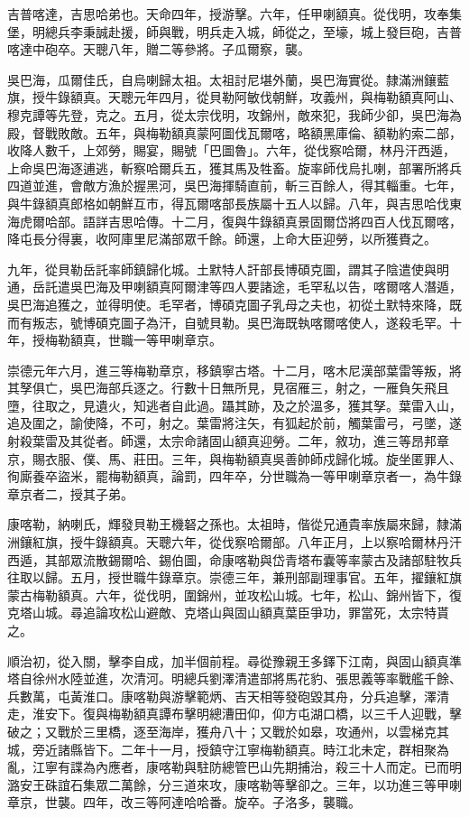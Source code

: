 \begin{pinyinscope}
吉普喀達，吉思哈弟也。天命四年，授游擊。六年，任甲喇額真。從伐明，攻奉集堡，明總兵李秉誠赴援，師與戰，明兵走入城，師從之，至壕，城上發巨砲，吉普喀達中砲卒。天聰八年，贈二等參將。子瓜爾察，襲。

吳巴海，瓜爾佳氏，自烏喇歸太祖。太祖討尼堪外蘭，吳巴海實從。隸滿洲鑲藍旗，授牛錄額真。天聰元年四月，從貝勒阿敏伐朝鮮，攻義州，與梅勒額真阿山、穆克譚等先登，克之。五月，從太宗伐明，攻錦州，敵來犯，我師少卻，吳巴海為殿，督戰敗敵。五年，與梅勒額真蒙阿圖伐瓦爾喀，略額黑庫倫、額勒約索二部，收降人數千，上郊勞，賜宴，賜號「巴圖魯」。六年，從伐察哈爾，林丹汗西遁，上命吳巴海逐逋逃，斬察哈爾兵五，獲其馬及牲畜。旋率師伐烏扎喇，部署所將兵四道並進，會敵方漁於握黑河，吳巴海揮騎直前，斬三百餘人，得其輜重。七年，與牛錄額真郎格如朝鮮互市，得瓦爾喀部長族屬十五人以歸。八年，與吉思哈伐東海虎爾哈部。語詳吉思哈傳。十二月，復與牛錄額真景固爾岱將四百人伐瓦爾喀，降屯長分得裏，收阿庫里尼滿部眾千餘。師還，上命大臣迎勞，以所獲賚之。

九年，從貝勒岳託率師鎮歸化城。土默特人訐部長博碩克圖，謂其子陰遣使與明通，岳託遣吳巴海及甲喇額真阿爾津等四人要諸途，毛罕私以告，喀爾喀人潛遁，吳巴海追獲之，並得明使。毛罕者，博碩克圖子乳母之夫也，初從土默特來降，既而有叛志，號博碩克圖子為汗，自號貝勒。吳巴海既執喀爾喀使人，遂殺毛罕。十年，授梅勒額真，世職一等甲喇章京。

崇德元年六月，進三等梅勒章京，移鎮寧古塔。十二月，喀木尼漢部葉雷等叛，將其孥俱亡，吳巴海部兵逐之。行數十日無所見，見宿雁三，射之，一雁負矢飛且墮，往取之，見遺火，知逃者自此過。躡其跡，及之於溫多，獲其孥。葉雷入山，追及圍之，諭使降，不可，射之。葉雷將注矢，有狐起於前，觸葉雷弓，弓墜，遂射殺葉雷及其從者。師還，太宗命諸固山額真迎勞。二年，敘功，進三等昂邦章京，賜衣服、僕、馬、莊田。三年，與梅勒額真吳善帥師戍歸化城。旋坐匿罪人、徇廝養卒盜米，罷梅勒額真，論罰，四年卒，分世職為一等甲喇章京者一，為牛錄章京者二，授其子弟。

康喀勒，納喇氏，輝發貝勒王機砮之孫也。太祖時，偕從兄通貴率族屬來歸，隸滿洲鑲紅旗，授牛錄額真。天聰六年，從伐察哈爾部。八年正月，上以察哈爾林丹汗西遁，其部眾流散錫爾哈、錫伯圖，命康喀勒與岱青塔布囊等率蒙古及諸部駐牧兵往取以歸。五月，授世職牛錄章京。崇德三年，兼刑部副理事官。五年，擢鑲紅旗蒙古梅勒額真。六年，從伐明，圍錦州，並攻松山城。七年，松山、錦州皆下，復克塔山城。尋追論攻松山避敵、克塔山與固山額真葉臣爭功，罪當死，太宗特貰之。

順治初，從入關，擊李自成，加半個前程。尋從豫親王多鐸下江南，與固山額真準塔自徐州水陸並進，次清河。明總兵劉澤清遣部將馬花豹、張思義等率戰艦千餘、兵數萬，屯黃淮口。康喀勒與游擊範炳、吉天相等發砲毀其舟，分兵追擊，澤清走，淮安下。復與梅勒額真譚布擊明總漕田仰，仰方屯湖口橋，以三千人迎戰，擊破之；又戰於三里橋，逐至海岸，獲舟八十；又戰於如皋，攻通州，以雲梯克其城，旁近諸縣皆下。二年十一月，授鎮守江寧梅勒額真。時江北未定，群相聚為亂，江寧有諜為內應者，康喀勒與駐防總管巴山先期捕治，殺三十人而定。已而明潞安王硃誼石集眾二萬餘，分三道來攻，康喀勒等擊卻之。三年，以功進三等甲喇章京，世襲。四年，改三等阿達哈哈番。旋卒。子洛多，襲職。


\end{pinyinscope}
